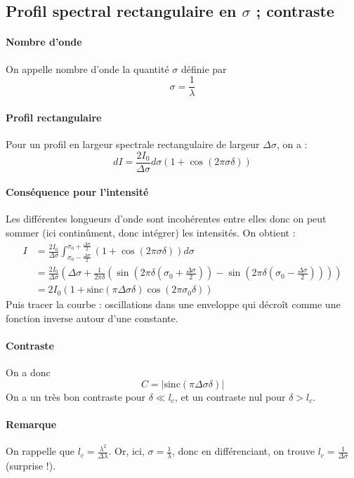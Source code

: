 \documentclass[french]{book}
\theoremstyle{plain}
\theoremstyle{definition}
\theoremstyle{remark}
\begin{document}
\subsection{Profil spectral rectangulaire en $\sigma$ ; contraste}
\paragraph{Nombre d'onde} On appelle nombre d'onde la quantité $\sigma$ définie par $$\sigma=\frac{1}{\lambda}$$
\paragraph{Profil rectangulaire} Pour un profil en largeur spectrale rectangulaire de largeur $\Delta\sigma$, on a : $$dI=\frac{2I_0}{\Delta\sigma}d\sigma\left(1+\cos\left(2\pi\sigma\delta\right)\right)$$
\paragraph{Conséquence pour l'intensité} Les différentes longueurs d'onde sont incohérentes entre elles donc on peut sommer (ici continûment, donc intégrer) les intensités. On obtient :
\begin{align*}
	I&=\frac{2I_0}{\Delta\sigma}\int_{\sigma_0-\frac{\Delta\sigma}{2}}^{\sigma_0+\frac{\Delta\sigma}{2}}\left(1+\cos\left(2\pi\sigma\delta\right)\right)d\sigma \\
	&=\frac{2I_0}{\Delta\sigma}\left(\Delta\sigma+\frac{1}{2\pi\delta}\left(\sin\left(2\pi\delta\left(\sigma_0+\frac{\Delta\sigma}{2}\right)\right)-\sin\left(2\pi\delta\left(\sigma_0-\frac{\Delta\sigma}{2}\right)\right)\right)\right) \\
	&=2I_0(1+\text{sinc}(\pi\Delta\sigma\delta)\cos(2\pi\sigma_0\delta))
\end{align*}
Puis tracer la courbe : oscillations dans une enveloppe qui décroît comme une fonction inverse autour d'une constante.
\paragraph{Contraste} On a donc $$C=\lvert\text{sinc}(\pi\Delta\sigma\delta)\rvert$$ On a un très bon contraste pour $\delta\ll l_c$, et un contraste nul pour $\delta >l_c$.
\paragraph{Remarque} On rappelle que $l_c=\displaystyle\frac{\lambda^2}{\Delta\lambda}$. Or, ici, $\displaystyle\sigma=\frac{1}{\lambda}$, donc en différenciant, on trouve $\displaystyle l_c=\frac{1}{\Delta\sigma}$ (surprise !).
\end{document}
